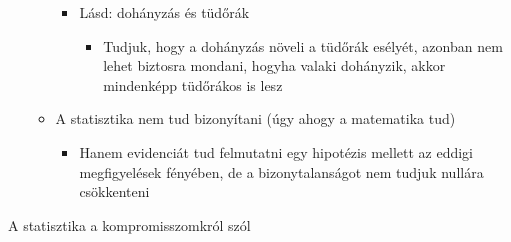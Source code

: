 \documentclass[
  letterpaper,
  DIV=11,
  numbers=noendperiod]{scrreprt}
\providecommand{\tightlist}{%
  \setlength{\itemsep}{0pt}\setlength{\parskip}{0pt}}\usepackage{longtable,booktabs,array}
\begin{document}
\begin{itemize}
\begin{itemize}
    \begin{itemize}
    \tightlist
    \item
      Lásd: dohányzás és tüdőrák

      \begin{itemize}
      \tightlist
      \item
        Tudjuk, hogy a dohányzás növeli a tüdőrák esélyét, azonban nem
        lehet biztosra mondani, hogyha valaki dohányzik, akkor
        mindenképp tüdőrákos is lesz
      \end{itemize}
    \end{itemize}
  \item
    A statisztika nem tud bizonyítani (úgy ahogy a matematika tud)

    \begin{itemize}
    \tightlist
    \item
      Hanem evidenciát tud felmutatni egy hipotézis mellett az eddigi
      megfigyelések fényében, de a bizonytalanságot nem tudjuk nullára
      csökkenteni
    \end{itemize}
  \end{itemize}
\end{itemize}

A statisztika a kompromisszomkról szól
\end{document}
